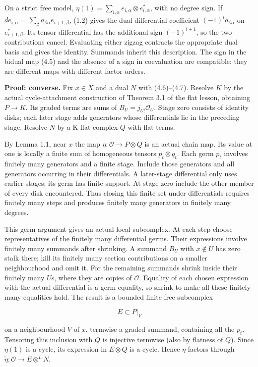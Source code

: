 \documentclass[
  english,
  11pt,
  a4paper,
]{article}
\begin{document}
On a strict free model,
\(\eta(1)=\sum_{i,\alpha}e_{i,\alpha}\otimes e_{i,\alpha}^*\), with no
degree sign. If
\(d e_{i,\alpha}=\sum_\beta a_{\beta\alpha}e_{i+1,\beta}\), (1.2) gives
the dual differential coefficient \((-1)^i a_{\beta\alpha}\) on
\(e_{i+1,\beta}^*\). Its tensor differential has the additional sign
\((-1)^{i+1}\), so the two contributions cancel. Evaluating either
zigzag contracts the appropriate dual basis and gives the identity.
Summands inherit this description. The sign in the bidual map (4.5) and
the absence of a sign in coevaluation are compatible: they are different
maps with different factor orders.

\textbf{Proof: converse.} Fix \(x\in X\) and a dual \(N\) with
(4.6)--(4.7). Resolve \(K\) by the actual cycle-attachment construction
of Theorem 3.1 of the flat lesson, obtaining \(P\to K\). Its graded
terms are sums of \(B_U=j_{U!}\mathcal O_U\). Stage zero consists of
identity disks; each later stage adds generators whose differentials lie
in the preceding stage. Resolve \(N\) by a K-flat complex \(Q\) with
flat terms.

By Lemma 1.1, near \(x\) the map \(\eta:\mathcal O\to P\otimes Q\) is an
actual chain map. Its value at one is locally a finite sum of
homogeneous tensors \(p_t\otimes q_t\). Each germ \(p_t\) involves
finitely many generators and a finite stage. Include those generators
and all generators occurring in their differentials. A later-stage
differential only uses earlier stages; its germ has finite support. At
stage zero include the other member of every disk encountered. Thus
closing this finite set under differentials requires finitely many steps
and produces finitely many generators in finitely many degrees.

This germ argument gives an actual local subcomplex. At each step choose
representatives of the finitely many differential germs. Their
expressions involve finitely many summands after shrinking. A summand
\(B_U\) with \(x\notin U\) has zero stalk there; kill its finitely many
section contributions on a smaller neighbourhood and omit it. For the
remaining summands shrink inside their finitely many
\(U\)\textquotesingle s, where they are copies of \(\mathcal O\).
Equality of each chosen expression with the actual differential is a
germ equality, so shrink to make all these finitely many equalities
hold. The result is a bounded finite free subcomplex

\[E\subset P|_V
\tag{4.9}\]

on a neighbourhood \(V\) of \(x\), termwise a graded summand, containing
all the \(p_t\). Tensoring this inclusion with \(Q\) is injective
termwise (also by flatness of \(Q\)). Since \(\eta(1)\) is a cycle, its
expression in \(E\otimes Q\) is a cycle. Hence \(\eta\) factors through
\(\widetilde\eta:\mathcal O\to E\otimes^L N\).
\end{document}
